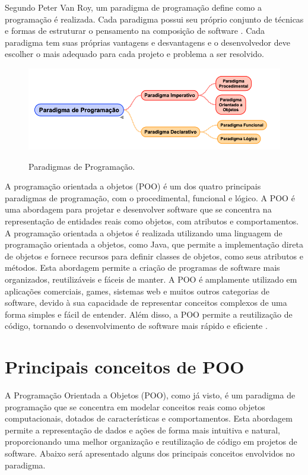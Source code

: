 Segundo Peter Van Roy, um paradigma de programação define como a programação é realizada. Cada paradigma possui seu próprio conjunto de técnicas e formas de estruturar o pensamento na composição de software \cite{vanroy2012}. Cada paradigma tem suas próprias vantagens e desvantagens e o desenvolvedor deve escolher o mais adequado para cada projeto e problema a ser resolvido.

\begin{figure}[H]
	\centering
	\caption{Paradigmas de Programação.}
	\includegraphics[scale=0.5]{imagens/paradigmas.png}
	\label{fig:paradigmas}
\end{figure}

A programação orientada a objetos (POO) é um dos quatro principais paradigmas de programação, com o procedimental, funcional e lógico. A POO é uma abordagem para projetar e desenvolver software que se concentra na representação de entidades reais como objetos, com atributos e comportamentos. A programação orientada a objetos é realizada utilizando uma linguagem de programação orientada a objetos, como Java, que permite a implementação direta de objetos e fornece recursos para definir classes de objetos, como seus atributos e métodos. Esta abordagem permite a criação de programas de software mais organizados, reutilizáveis e fáceis de manter. A POO é amplamente utilizado em aplicações comerciais, games, sistemas web e muitos outros categorias de software, devido à sua capacidade de representar conceitos complexos de uma forma simples e fácil de entender. Além disso, a POO permite a reutilização de código, tornando o desenvolvimento de software mais rápido e eficiente \cite{sommerville2003engenharia}.

\section{Principais conceitos de POO}

A Programação Orientada a Objetos (POO), como já visto, é um paradigma de programação que se concentra em modelar conceitos reais como objetos computacionais, dotados de características e comportamentos. Esta abordagem permite a representação de dados e ações de forma mais intuitiva e natural, proporcionando uma melhor organização e reutilização de código em projetos de software. Abaixo será apresentado alguns dos principais conceitos envolvidos no paradigma.

